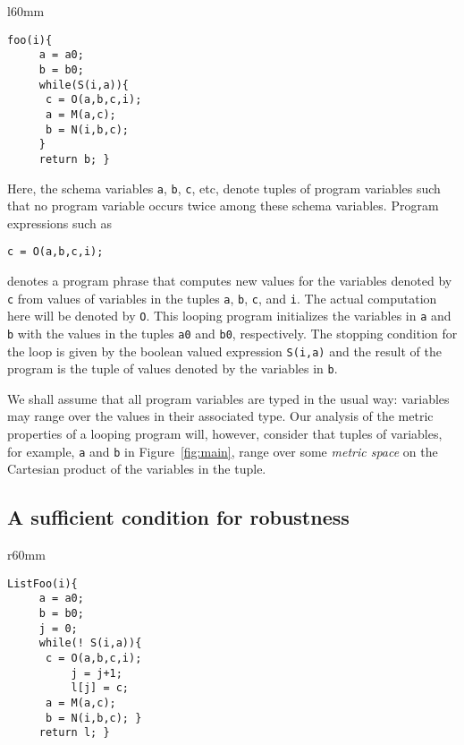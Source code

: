 \documentclass[copyright,creativecommons]{eptcs}
\begin{document}
\begin{wrapfigure}{l}{60mm}
\begin{lstlisting}[language=pscode]
foo(i){
     a = a0;
     b = b0;
     while(S(i,a)){
	  c = O(a,b,c,i);
	  a = M(a,c);
	  b = N(i,b,c);
     }
     return b; }
\end{lstlisting}
\caption{The main template}\label{fig:main}
\end{wrapfigure}

Here, the schema variables {\tt a}, {\tt b}, {\tt c}, etc, denote
tuples of program variables such that no program variable occurs
twice among these schema variables. Program expressions such as 
\begin{lstlisting}
c = O(a,b,c,i);
\end{lstlisting}
denotes a program phrase that computes new values for the variables denoted
by {\tt c} from values of variables in the tuples {\tt a}, {\tt b},
{\tt c}, and {\tt i}.  The actual computation here will be denoted by
{\tt O}.  This looping program initializes the variables in {\tt a} and
{\tt b} with the values in the tuples {\tt a0} and
{\tt b0}, respectively.  The stopping condition for the loop is given
by the boolean valued expression {\tt S(i,a)} and the result of the
program is the tuple of values denoted by the variables in {\tt b}. 

We shall assume that all program variables are typed in the usual way:
variables may range over the values in their associated type.  Our
analysis of the metric properties of a looping program will, however,
consider that tuples of variables, for example, {\tt a} and {\tt b} in
Figure~\ref{fig:main}, range over some {\em metric space} on the
Cartesian product of the variables in the tuple.


\subsection{A sufficient condition for robustness}\label{sec:robustness}



\begin{wrapfigure}{r}{60mm}
\begin{lstlisting}[language=pscode]
ListFoo(i){
     a = a0;
     b = b0;
     j = 0;
     while(! S(i,a)){
	  c = O(a,b,c,i);
          j = j+1;
          l[j] = c;
	  a = M(a,c);
	  b = N(i,b,c); }
     return l; }
\end{lstlisting}
\caption{Collecting {\tt c} values in a list}\label{fig:listfoo}
\end{wrapfigure}
\end{document}
